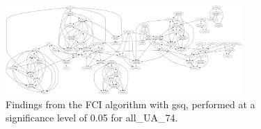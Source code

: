 \begin{figure}[htbp]
    \centering
    \includegraphics[width=0.8\textwidth]{Report/final_report/pictures/FCI_gsq_0.05_all_UA_74.png}
    \caption{Findings from the FCI algorithm with gsq, performed at a significance level of 0.05 for all_UA_74.}
    \label{fig:fci_gsq_0.05all_UA_74}
\end{figure}
